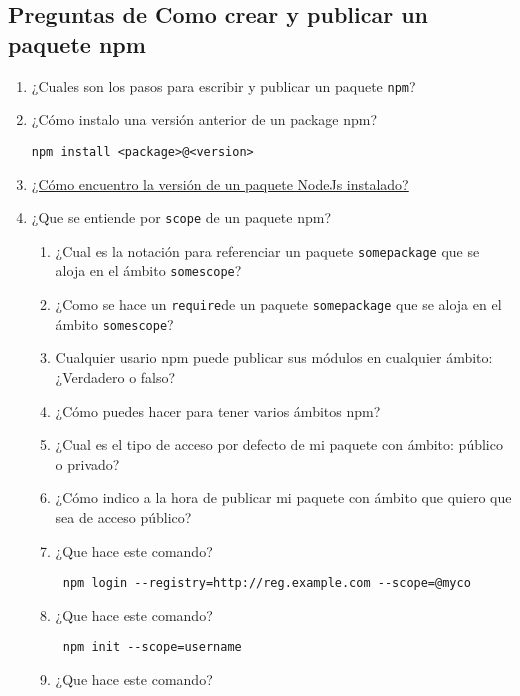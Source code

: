 \subsection{Preguntas de Como crear y publicar un paquete
npm}\label{preguntas-de-como-crear-y-publicar-un-paquete-npm}

\begin{enumerate}
\def\labelenumi{\arabic{enumi}.}
\setcounter{enumi}{9}
\item
  ¿Cuales son los pasos para escribir y publicar un paquete
  \texttt{npm}?
\item
  ¿Cómo instalo una versión anterior de un package npm?

\begin{verbatim}
npm install <package>@<version>
\end{verbatim}
\item
  \href{http://stackoverflow.com/questions/10972176/find-the-version-of-an-installed-npm-package}{¿Cómo
  encuentro la versión de un paquete NodeJs instalado?}
\item
  ¿Que se entiende por \texttt{scope} de un paquete npm?

  \begin{enumerate}
  \def\labelenumii{\arabic{enumii}.}
  \item
    ¿Cual es la notación para referenciar un paquete
    \texttt{somepackage} que se aloja en el ámbito \texttt{somescope}?
  \item
    ¿Como se hace un \texttt{require}de un paquete \texttt{somepackage}
    que se aloja en el ámbito \texttt{somescope}?
  \item
    Cualquier usario npm puede publicar sus módulos en cualquier ámbito:
    ¿Verdadero o falso?
  \item
    ¿Cómo puedes hacer para tener varios ámbitos npm?
  \item
    ¿Cual es el tipo de acceso por defecto de mi paquete con ámbito:
    público o privado? 
  \item
    ¿Cómo indico a la hora de publicar mi paquete con ámbito que quiero
    que sea de acceso público? 
  \item
    ¿Que hace este comando?

\begin{verbatim}
 npm login --registry=http://reg.example.com --scope=@myco
\end{verbatim}
  \item
    ¿Que hace este comando?

\begin{verbatim}
 npm init --scope=username
\end{verbatim}
  \item
    ¿Que hace este comando?


\end{enumerate}
\end{enumerate}
